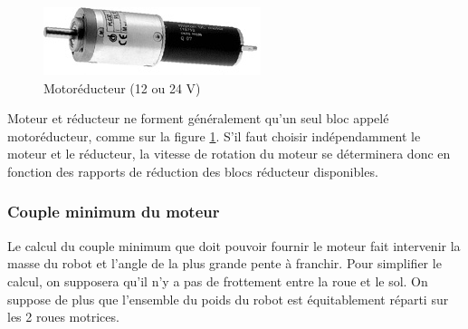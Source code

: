 \documentclass[a4paper]{article}
\begin{document}
\begin{figure}[H]
	\centering
	\includegraphics[scale=0.75]{Images/Motoreducteur.png}
	\caption{Motoréducteur (12 ou 24 V)
		\label{Motoreducteur}}
\end{figure}

Moteur et réducteur ne forment généralement qu'un seul bloc appelé motoréducteur, comme sur la figure \ref{Motoreducteur}. S'il faut choisir indépendamment le moteur et le réducteur, la vitesse de rotation du moteur se déterminera donc en fonction des rapports de réduction des blocs réducteur disponibles.

\subsubsection{Couple minimum du moteur}

Le calcul du couple minimum que doit pouvoir fournir le moteur fait intervenir la masse du robot et l'angle de la plus grande pente à franchir. Pour simplifier le calcul, on supposera qu'il n'y a pas de frottement entre la roue et le sol. On suppose de plus que l'ensemble du poids du robot est équitablement réparti sur les 2 roues motrices.
\end{document}
